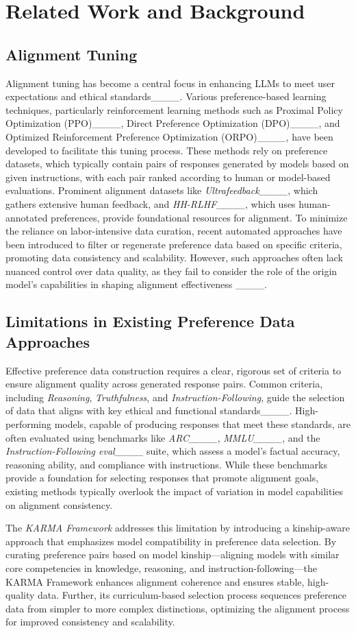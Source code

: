 \section{Related Work and Background}
\subsection{Alignment Tuning}
Alignment tuning has become a central focus in enhancing LLMs to meet user expectations and ethical standards____. Various preference-based learning techniques, particularly reinforcement learning methods such as Proximal Policy Optimization (PPO)____, Direct Preference Optimization (DPO)____, and Optimized Reinforcement Preference Optimization (ORPO)____, have been developed to facilitate this tuning process. These methods rely on preference datasets, which typically contain pairs of responses generated by models based on given instructions, with each pair ranked according to human or model-based evaluations. Prominent alignment datasets like \textit{Ultrafeedback____}, which gathers extensive human feedback, and \textit{HH-RLHF____}, which uses human-annotated preferences, provide foundational resources for alignment. To minimize the reliance on labor-intensive data curation, recent automated approaches have been introduced to filter or regenerate preference data based on specific criteria, promoting data consistency and scalability. However, such approaches often lack nuanced control over data quality, as they fail to consider the role of the origin model’s capabilities in shaping alignment effectiveness ____.

\subsection{Limitations in Existing Preference Data Approaches}
Effective preference data construction requires a clear, rigorous set of criteria to ensure alignment quality across generated response pairs. Common criteria, including \textit{Reasoning}, \textit{Truthfulness}, and \textit{Instruction-Following}, guide the selection of data that aligns with key ethical and functional standards____. High-performing models, capable of producing responses that meet these standards, are often evaluated using benchmarks like \textit{ARC____}, \textit{MMLU____}, and the \textit{Instruction-Following eval____} suite, which assess a model’s factual accuracy, reasoning ability, and compliance with instructions. While these benchmarks provide a foundation for selecting responses that promote alignment goals, existing methods typically overlook the impact of variation in model capabilities on alignment consistency. 

The \textit{KARMA Framework} addresses this limitation by introducing a kinship-aware approach that emphasizes model compatibility in preference data selection. By curating preference pairs based on model kinship—aligning models with similar core competencies in knowledge, reasoning, and instruction-following—the KARMA Framework enhances alignment coherence and ensures stable, high-quality data. Further, its curriculum-based selection process sequences preference data from simpler to more complex distinctions, optimizing the alignment process for improved consistency and scalability.